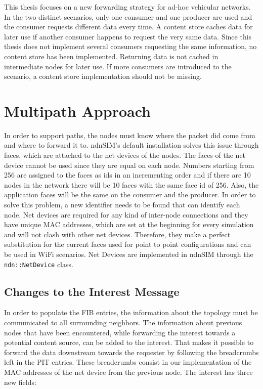 This thesis focuses on a new forwarding strategy for ad-hoc vehicular networks. In the two distinct scenarios, only one consumer and one producer are used and the consumer requests different data every time. A content store caches data for later use if another consumer happens to request the very same data. Since this thesis does not implement several consumers requesting the same information, no content store has been implemented. Returning data is not cached in intermediate nodes for later use. If more consumers are introduced to the scenario, a content store implementation should not be missing.


\section{Multipath Approach}

In order to support paths, the nodes must know where the packet did come from and where to forward it to. ndnSIM's default installation solves this issue through faces, which are attached to the net devices of the nodes. The faces of the net device cannot be used since they are equal on each node. Numbers starting from 256 are assigned to the faces as ids in an incrementing order and if there are 10 nodes in the network there will be 10 faces with the same face id of 256. Also, the application faces will be the same on the consumer and the producer. In order to solve this problem, a new identifier needs to be found that can identify each node. Net devices are required for any kind of inter-node connections and they have unique MAC addresses, which are set at the beginning for every simulation and will not clash with other net devices. Therefore, they make a perfect substitution for the current faces used for point to point configurations and can be used in WiFi scenarios. Net Devices are implemented in ndnSIM through the \texttt{ndn::NetDevice} class.

\subsection{Changes to the Interest Message}

In order to populate the FIB entries, the information about the topology must be communicated to all surrounding neighbors. The information about previous nodes that have been encountered, while forwarding the interest towards a potential content source, can be added to the interest. That makes it possible to forward the data downstream towards the requester by following the breadcrumbs left in the PIT entries. These breadcrumbs consist in our implementation of the MAC addresses of the net device from the previous node. The interest has three new fields:

